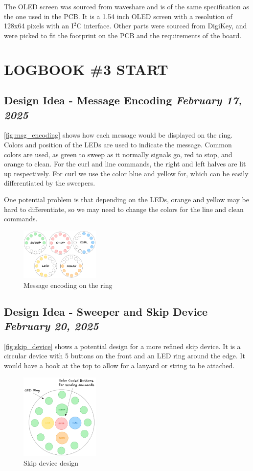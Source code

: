 \documentclass{article}
\newcommand{\logbookentry}[2]{
    \subsection*{#1 \hfill \textit{#2}} 
}
\begin{document}
The OLED screen was sourced from waveshare and is of the same specification as the one used in the PCB. It is a 1.54 inch OLED screen with a resolution of 128x64 pixels with an I$^2$C interface. Other parts were sourced from DigiKey, and were picked to fit the footprint on the PCB and the requirements of the board.
\newpage
\section{LOGBOOK \#3 START}
\logbookentry{Design Idea - Message Encoding}{February 17, 2025}
\autoref{fig:msg_encoding} shows how each message would be displayed on the ring. Colors and position of the LEDs are used to indicate the message. Common colors are used, as green to sweep as it normally signals go, red to stop, and orange to clean. For the curl and line commands, the right and left halves are lit up respectively. For curl we use the color blue and yellow for, which can be easily differentiated by the sweepers. 

One potential problem is that depending on the LEDs, orange and yellow may be hard to differentiate, so we may need to change the colors for the line and clean commands.
\begin{figure}[ht!]
    \centering
    \includegraphics[width=0.35\textwidth]{msg_encoding.png}
    \caption{Message encoding on the ring}
    \label{fig:msg_encoding}
\end{figure}

\logbookentry{Design Idea - Sweeper and Skip Device}{February 20, 2025}
\autoref{fig:skip_device} shows a potential design for a more refined skip device. It is a circular device with 5 buttons on the front and an LED ring around the edge. It would have a hook at the top to allow for a lanyard or string to be attached. 

\begin{figure}[ht!]
    \centering
    \includegraphics[width=0.35\textwidth]{skip_device.png}
    \caption{Skip device design}
    \label{fig:skip_device}
\end{figure}
\end{document}
